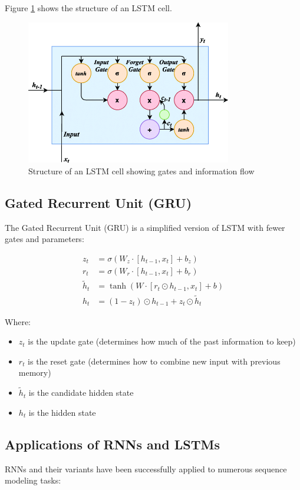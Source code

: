 \documentclass[11pt,a4paper]{report}
\begin{document}
Figure \ref{fig:lstm-cell} shows the structure of an LSTM cell.

\begin{figure}[ht]
    \centering
    \includegraphics[width=0.8\textwidth]{lstm_cell_structure.png}
    \caption{Structure of an LSTM cell showing gates and information flow}
    \label{fig:lstm-cell}
\end{figure}

\subsection{Gated Recurrent Unit (GRU)}
The Gated Recurrent Unit (GRU) is a simplified version of LSTM with fewer gates and parameters:

\begin{align}
z_t &= \sigma(W_z \cdot [h_{t-1}, x_t] + b_z) \\
r_t &= \sigma(W_r \cdot [h_{t-1}, x_t] + b_r) \\
\tilde{h}_t &= \tanh(W \cdot [r_t \odot h_{t-1}, x_t] + b) \\
h_t &= (1 - z_t) \odot h_{t-1} + z_t \odot \tilde{h}_t
\end{align}

Where:
\begin{itemize}
    \item $z_t$ is the update gate (determines how much of the past information to keep)
    \item $r_t$ is the reset gate (determines how to combine new input with previous memory)
    \item $\tilde{h}_t$ is the candidate hidden state
    \item $h_t$ is the hidden state
\end{itemize}

\subsection{Applications of RNNs and LSTMs}
RNNs and their variants have been successfully applied to numerous sequence modeling tasks:
\end{document}
